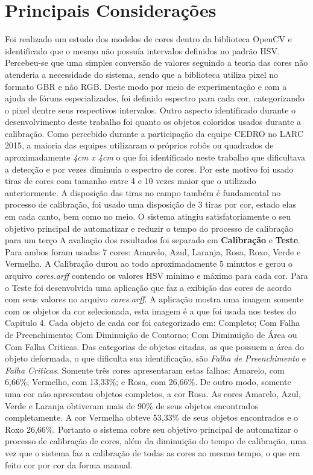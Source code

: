 \section{Principais Considerações}
	Foi realizado um estudo dos modelos de cores dentro da biblioteca OpenCV e identificado que o mesmo não possuía intervalos definidos no padrão HSV. Percebeu-se que uma simples conversão de valores seguindo a teoria das cores não atenderia a necessidade do sistema, sendo que a biblioteca utiliza pixel no formato GBR e não RGB. Deste modo por meio de experimentação e com a ajuda de fóruns especializados, foi definido espectro para cada cor, categorizando o pixel dentre seus respectivos intervalos.
	Outro aspecto identificado durante o desenvolvimento deste trabalho foi quanto os objetos coloridos usados durante a calibração. Como percebido durante a participação da equipe CEDRO no LARC 2015, a maioria das equipes utilizaram o próprios robôs ou quadrados de aproximadamente \textit{4cm x 4cm} o que foi identificado neste trabalho que dificultava a detecção e por vezes diminuía o espectro de cores. Por este motivo foi usado tiras de cores com tamanho entre 4 e 10 vezes maior que o utilizado anteriormente. A disposição das tiras no campo também é fundamental no processo de calibração, foi usado uma disposição de 3 tiras por cor, estado elas em cada canto, bem como no meio.
	O sistema atingiu satisfatoriamente o seu objetivo principal de automatizar e reduzir o tempo do processo de calibração para um terço 
A avaliação dos resultados foi separado em \textbf{Calibração} e \textbf{Teste}. Para ambos foram usadas 7 cores: Amarelo, Azul, Laranja, Rosa, Roxo, Verde e Vermelho. A Calibração durou ao todo aproximadamente 5 minutos e gerou o arquivo \textit{cores.arff} contendo os valores HSV mínimo e máximo para cada cor. Para o Teste foi desenvolvida uma aplicação que faz a exibição das cores de acordo com seus valores no arquivo \textit{cores.arff}. A aplicação mostra uma imagem somente com os objetos da cor selecionada, esta imagem é a que foi usada nos testes do Capitulo 4. Cada objeto de cada cor foi categorizado em: Completo; Com Falha de Preenchimento; Com Diminuição de Contorno; Com Diminuição de Área ou Com Falha Criticas. Das categorias de objetos citadas, as que possuem a área do objeto deformada, o que dificulta sua identificação, são \textit{Falha de Preenchimento} e \textit{Falha Criticas}. Somente tr\^{e}s cores apresentaram estas falhas: Amarelo, com 6,66\%; Vermelho, com 13,33\%; e Rosa, com 26,66\%. De outro modo, somente uma cor não apresentou objetos completos, a cor Rosa. As cores Amarelo, Azul, Verde e Laranja obtiveram mais de 90\% de seus objetos encontrados completamente. A cor Vermelha obteve 53,33\% de seus objetos encontrados e o Roxo 26,66\%. 
Portanto o sistema cobre seu objetivo principal de automatizar o processo de calibração de cores, além da diminuição do tempo de calibração, uma vez que o sistema faz a calibração de todas as cores ao mesmo tempo, o que era feito cor por cor da forma manual.	

